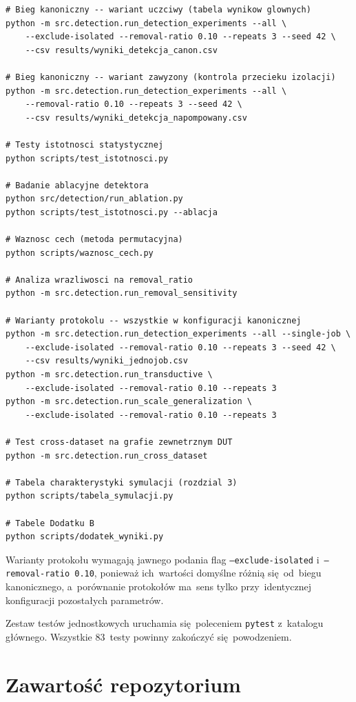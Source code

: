 \documentclass[polish,master,a4paper,oneside]{ppfcmthesis}
\renewcommand{\_}{\origtextunderscore\ifmmode\else\allowbreak\fi}
\begin{document}
\begin{lstlisting}[numbers=none,language={}]
# Bieg kanoniczny -- wariant uczciwy (tabela wynikow glownych)
python -m src.detection.run_detection_experiments --all \
    --exclude-isolated --removal-ratio 0.10 --repeats 3 --seed 42 \
    --csv results/wyniki_detekcja_canon.csv

# Bieg kanoniczny -- wariant zawyzony (kontrola przecieku izolacji)
python -m src.detection.run_detection_experiments --all \
    --removal-ratio 0.10 --repeats 3 --seed 42 \
    --csv results/wyniki_detekcja_napompowany.csv

# Testy istotnosci statystycznej
python scripts/test_istotnosci.py

# Badanie ablacyjne detektora
python src/detection/run_ablation.py
python scripts/test_istotnosci.py --ablacja

# Waznosc cech (metoda permutacyjna)
python scripts/waznosc_cech.py

# Analiza wrazliwosci na removal_ratio
python -m src.detection.run_removal_sensitivity

# Warianty protokolu -- wszystkie w konfiguracji kanonicznej
python -m src.detection.run_detection_experiments --all --single-job \
    --exclude-isolated --removal-ratio 0.10 --repeats 3 --seed 42 \
    --csv results/wyniki_jednojob.csv
python -m src.detection.run_transductive \
    --exclude-isolated --removal-ratio 0.10 --repeats 3
python -m src.detection.run_scale_generalization \
    --exclude-isolated --removal-ratio 0.10 --repeats 3

# Test cross-dataset na grafie zewnetrznym DUT
python -m src.detection.run_cross_dataset

# Tabela charakterystyki symulacji (rozdzial 3)
python scripts/tabela_symulacji.py

# Tabele Dodatku B
python scripts/dodatek_wyniki.py
\end{lstlisting}

Warianty protokołu wymagają jawnego podania flag \texttt{--exclude-isolated}
i~\texttt{--removal-ratio 0.10}, ponieważ ich~wartości domyślne różnią się~od~biegu
kanonicznego, a~porównanie protokołów ma~sens tylko przy~identycznej
konfiguracji pozostałych parametrów.

Zestaw testów jednostkowych uruchamia się~poleceniem \texttt{pytest}
z~katalogu głównego. Wszystkie 83~testy powinny zakończyć się~powodzeniem.

\section{Zawartość repozytorium}
\end{document}
